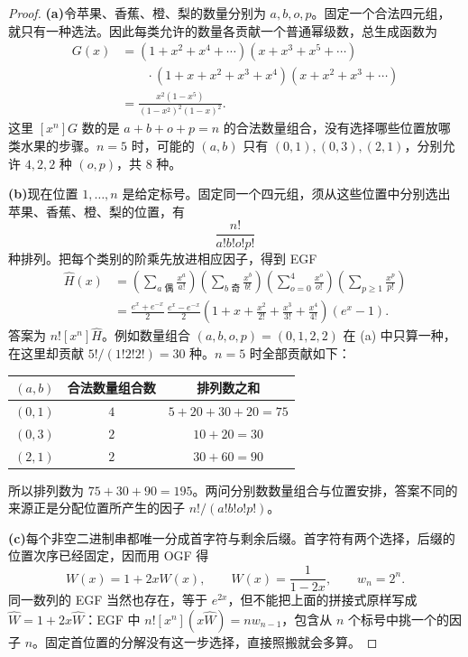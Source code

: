 \documentclass[lang=cn,a4paper,fontset=none,zihao=false,10pt,openany,twoside]{beautybook}
\numberwithin{algorithm}{chapter}
\begin{document}
\begin{proof}
\par\smallskip\noindent\textbf{(a)}\quad 令苹果、香蕉、橙、梨的数量分别为 $a,b,o,p$。固定一个合法四元组，就只有一种选法。因此每类允许的数量各贡献一个普通幂级数，总生成函数为
\[
 \begin{aligned}
 G(x)
 &=(1+x^2+x^4+\cdots)(x+x^3+x^5+\cdots)\\
 &\qquad\cdot(1+x+x^2+x^3+x^4)(x+x^2+x^3+\cdots)\\
 &=\frac{x^2(1-x^5)}{(1-x^2)^2(1-x)^2}.
 \end{aligned}
\]
这里 $[x^n]G$ 数的是 $a+b+o+p=n$ 的合法数量组合，没有选择哪些位置放哪类水果的步骤。$n=5$ 时，可能的 $(a,b)$ 只有 $(0,1),(0,3),(2,1)$，分别允许 $4,2,2$ 种 $(o,p)$，共 $8$ 种。

\par\smallskip\noindent\textbf{(b)}\quad 现在位置 $1,\ldots,n$ 是给定标号。固定同一个四元组，须从这些位置中分别选出苹果、香蕉、橙、梨的位置，有
\[
 \frac{n!}{a!b!o!p!}
\]
种排列。把每个类别的阶乘先放进相应因子，得到 EGF
\[
 \begin{aligned}
 \widehat H(x)
 &=\left(\sum_{a\text{ 偶}}\frac{x^a}{a!}\right)
   \left(\sum_{b\text{ 奇}}\frac{x^b}{b!}\right)
   \left(\sum_{o=0}^4\frac{x^o}{o!}\right)
   \left(\sum_{p\ge1}\frac{x^p}{p!}\right)\\
 &=\frac{e^x+e^{-x}}2\,\frac{e^x-e^{-x}}2
   \left(1+x+\frac{x^2}{2!}+\frac{x^3}{3!}+\frac{x^4}{4!}\right)(e^x-1).
 \end{aligned}
\]
答案为 $n![x^n]\widehat H$。例如数量组合 $(a,b,o,p)=(0,1,2,2)$ 在 (a) 中只算一种，在这里却贡献 $5!/(1!2!2!)=30$ 种。$n=5$ 时全部贡献如下：
\begin{center}
\begin{tabular}{@{}ccc@{}}
\toprule
$(a,b)$ & 合法数量组合数 & 排列数之和\\
\midrule
$(0,1)$ & $4$ & $5+20+30+20=75$\\
$(0,3)$ & $2$ & $10+20=30$\\
$(2,1)$ & $2$ & $30+60=90$\\
\bottomrule
\end{tabular}
\end{center}
所以排列数为 $75+30+90=195$。两问分别数数量组合与位置安排，答案不同的来源正是分配位置所产生的因子 $n!/(a!b!o!p!)$。

\par\smallskip\noindent\textbf{(c)}\quad 每个非空二进制串都唯一分成首字符与剩余后缀。首字符有两个选择，后缀的位置次序已经固定，因而用 OGF 得
\[
 W(x)=1+2xW(x),\qquad W(x)=\frac1{1-2x},
 \qquad w_n=2^n.
\]
同一数列的 EGF 当然也存在，等于 $e^{2x}$，但不能把上面的拼接式原样写成 $\widehat W=1+2x\widehat W$：EGF 中 $n![x^n](x\widehat W)=nw_{n-1}$，包含从 $n$ 个标号中挑一个的因子 $n$。固定首位置的分解没有这一步选择，直接照搬就会多算。
\end{proof}
\end{document}
